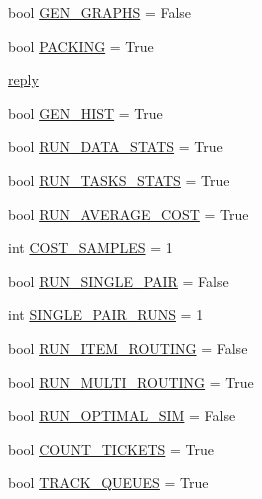 \begin{DoxyCompactItemize}
bool \hyperlink{namespacedynamicfilterapp_1_1toggles_a57c1e3f291181d680f3ee118fa5c4ab8}{G\+E\+N\+\_\+\+G\+R\+A\+P\+HS} = False
\item 
bool \hyperlink{namespacedynamicfilterapp_1_1toggles_a23735ccf05ebd9212e9ebaab8f652507}{P\+A\+C\+K\+I\+NG} = True
\item 
\hyperlink{namespacedynamicfilterapp_1_1toggles_a496267841b3ab9e872499fd2731736ff}{reply}
\item 
bool \hyperlink{namespacedynamicfilterapp_1_1toggles_a242327c0cdef5981d6e14793e1446957}{G\+E\+N\+\_\+\+H\+I\+ST} = True
\item 
bool \hyperlink{namespacedynamicfilterapp_1_1toggles_a36bc09bc8fbde0df2ea1c5d9ed0cf135}{R\+U\+N\+\_\+\+D\+A\+T\+A\+\_\+\+S\+T\+A\+TS} = True
\item 
bool \hyperlink{namespacedynamicfilterapp_1_1toggles_a70268a3d46d10702df56c16b2af24cc9}{R\+U\+N\+\_\+\+T\+A\+S\+K\+S\+\_\+\+S\+T\+A\+TS} = True
\item 
bool \hyperlink{namespacedynamicfilterapp_1_1toggles_a21f2f0f4c6df7faefb843dd318af3452}{R\+U\+N\+\_\+\+A\+V\+E\+R\+A\+G\+E\+\_\+\+C\+O\+ST} = True
\item 
int \hyperlink{namespacedynamicfilterapp_1_1toggles_a134ac33ad7706cd6a24fda5b63c73c65}{C\+O\+S\+T\+\_\+\+S\+A\+M\+P\+L\+ES} = 1
\item 
bool \hyperlink{namespacedynamicfilterapp_1_1toggles_ab61137c2de5f99b09789a6e76b7cda4c}{R\+U\+N\+\_\+\+S\+I\+N\+G\+L\+E\+\_\+\+P\+A\+IR} = False
\item 
int \hyperlink{namespacedynamicfilterapp_1_1toggles_a70d4dc65db288020e23ca213cd97c0f8}{S\+I\+N\+G\+L\+E\+\_\+\+P\+A\+I\+R\+\_\+\+R\+U\+NS} = 1
\item 
bool \hyperlink{namespacedynamicfilterapp_1_1toggles_a41d76408f27c5889dc3f40f066583a9f}{R\+U\+N\+\_\+\+I\+T\+E\+M\+\_\+\+R\+O\+U\+T\+I\+NG} = False
\item 
bool \hyperlink{namespacedynamicfilterapp_1_1toggles_a5f084acb116f3a65b90532f6a2ecb81b}{R\+U\+N\+\_\+\+M\+U\+L\+T\+I\+\_\+\+R\+O\+U\+T\+I\+NG} = True
\item 
bool \hyperlink{namespacedynamicfilterapp_1_1toggles_a82ca5524da03a0787588ac48df06bb1a}{R\+U\+N\+\_\+\+O\+P\+T\+I\+M\+A\+L\+\_\+\+S\+IM} = False
\item 
bool \hyperlink{namespacedynamicfilterapp_1_1toggles_ac35fabae4c109189ac40e759f367ee79}{C\+O\+U\+N\+T\+\_\+\+T\+I\+C\+K\+E\+TS} = True
\item 
bool \hyperlink{namespacedynamicfilterapp_1_1toggles_a170d7dba5203e9b2ab89eb541ed83b3a}{T\+R\+A\+C\+K\+\_\+\+Q\+U\+E\+U\+ES} = True

\end{DoxyCompactItemize}
